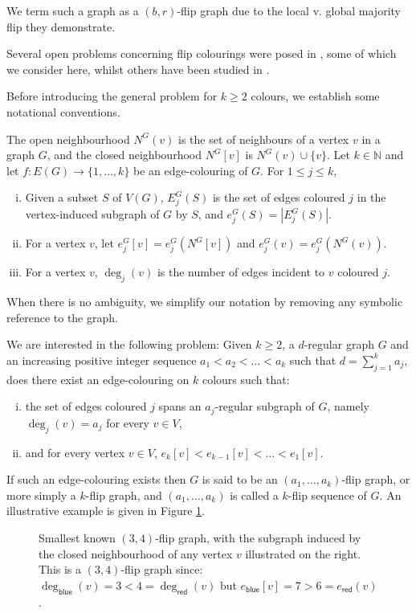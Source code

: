 \documentclass[a4paper,12pt]{article}
\begin{document}
We term such a graph as a $(b, r)$-flip graph due to the local v. global majority flip they demonstrate. 

Several open problems concerning flip colourings were posed in \cite{caro2023flip}, some of which we consider here, whilst others have been studied in \cite{sheffield2025}. 

Before introducing the general problem for $k \geq 2$ colours, we establish some notational conventions. 

The open neighbourhood $N^G (v)$ is the set of neighbours of a vertex $v$ in a graph $G$, and the closed neighbourhood $N^G[v]$ is $N^G (v) \cup \{v\}$. 
Let $k \in \mathbb{N}$ and let $f \colon E(G) \rightarrow \{1, \dots, k\}$ be an edge-colouring of $G$. For $1 \leq j \leq k$,
\begin{enumerate}[i.]
	\item Given a subset $S$ of $V(G)$, $E^G_j (S)$ is the set of edges coloured $j$ in the vertex-induced subgraph of $G$ by $S$, and $e^G_j (S) = |E^G_j (S)|$.
	\item For a vertex $v$, let $e^G_j [v] = e^G_j \left(N^G[v]\right)$ and $e^G_j (v) = e^G_j \left(N^G(v)\right)$.
	\item For a vertex $v$, $\deg_j (v)$ is the number of edges incident to $v$ coloured $j$.
\end{enumerate}

When there is no ambiguity, we simplify our notation by removing any symbolic reference to the graph.

We are interested in the following problem: Given $k \geq 2$, a $d$-regular graph $G$ and an increasing positive integer sequence $a_1 < a_2 < \dots < a_k$ such that $d = \sum_{j=1}^k a_j$, does there exist an edge-colouring on $k$ colours such that:
\begin{enumerate}[i.]
	\item the set of edges coloured $j$ spans an $a_j$-regular subgraph of $G$, namely $\deg_j(v) = a_j$ for every $v\in V$,
	\item and for every vertex $v \in  V$,  $e_k[v] < e_{k-1}[v] < \ldots <  e_1[v]$.
\end{enumerate}   
 
If such an edge-colouring exists then $G$ is said to be an $(a_1,\ldots,a_k)$-flip graph, or more simply a $k$-flip graph, and $(a_1, \dots, a_k)$ is called a $k$-flip sequence of $G$. An illustrative example is given in Figure \ref{flip_4_3_smallest}.

\begin{figure}[ht!]
	\centering
	\caption{Smallest known $(3, 4)$-flip graph, with the subgraph induced by the closed neighbourhood of any vertex $v$ illustrated on the right. This is a $(3, 4)$-flip graph since: $\deg_{\mathsf{blue}}(v) = 3 < 4 = \deg_{\mathsf{red}}(v)$ but $e_{\mathsf{blue}}[v] = 7 > 6 = e_{\mathsf{red}}(v)$.}
	\label{flip_4_3_smallest}
\end{figure}
\end{document}

